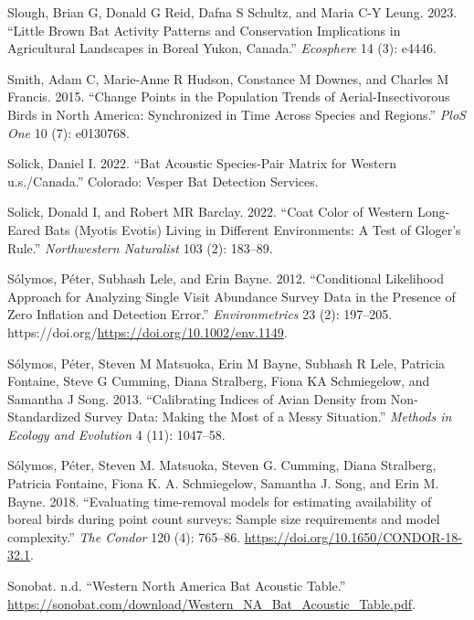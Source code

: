 \documentclass[
  letterpaper,
  DIV=11,
  numbers=noendperiod]{scrartcl}
\newlength{\cslhangindent}
\newenvironment{CSLReferences}[2] %
 {\begin{list}{}{%
  \setlength{\itemindent}{0pt}
  \setlength{\leftmargin}{0pt}
  \setlength{\parsep}{0pt}
  \ifodd #1
   \setlength{\leftmargin}{\cslhangindent}
   \setlength{\itemindent}{-1\cslhangindent}
  \fi
  \setlength{\itemsep}{#2\baselineskip}}}
 {\end{list}}
\begin{document}
\begin{CSLReferences}{1}{0}
Slough, Brian G, Donald G Reid, Dafna S Schultz, and Maria C-Y Leung.
2023. {``Little Brown Bat Activity Patterns and Conservation
Implications in Agricultural Landscapes in Boreal Yukon, Canada.''}
\emph{Ecosphere} 14 (3): e4446.

Smith, Adam C, Marie-Anne R Hudson, Constance M Downes, and Charles M
Francis. 2015. {``Change Points in the Population Trends of
Aerial-Insectivorous Birds in North America: Synchronized in Time Across
Species and Regions.''} \emph{PloS One} 10 (7): e0130768.

Solick, Daniel I. 2022. {``Bat Acoustic Species-Pair Matrix for Western
u.s./Canada.''} Colorado: Vesper Bat Detection Services.

Solick, Donald I, and Robert MR Barclay. 2022. {``Coat Color of Western
Long-Eared Bats (Myotis Evotis) Living in Different Environments: A Test
of Gloger's Rule.''} \emph{Northwestern Naturalist} 103 (2): 183--89.

Sólymos, Péter, Subhash Lele, and Erin Bayne. 2012. {``Conditional
Likelihood Approach for Analyzing Single Visit Abundance Survey Data in
the Presence of Zero Inflation and Detection Error.''}
\emph{Environmetrics} 23 (2): 197--205.
https://doi.org/\url{https://doi.org/10.1002/env.1149}.

Sólymos, Péter, Steven M Matsuoka, Erin M Bayne, Subhash R Lele,
Patricia Fontaine, Steve G Cumming, Diana Stralberg, Fiona KA
Schmiegelow, and Samantha J Song. 2013. {``Calibrating Indices of Avian
Density from Non-Standardized Survey Data: Making the Most of a Messy
Situation.''} \emph{Methods in Ecology and Evolution} 4 (11): 1047--58.

Sólymos, Péter, Steven M. Matsuoka, Steven G. Cumming, Diana Stralberg,
Patricia Fontaine, Fiona K. A. Schmiegelow, Samantha J. Song, and Erin
M. Bayne. 2018. {``{Evaluating time-removal models for estimating
availability of boreal birds during point count surveys: Sample size
requirements and model complexity}.''} \emph{The Condor} 120 (4):
765--86. \url{https://doi.org/10.1650/CONDOR-18-32.1}.

Sonobat. n.d. {``Western North America Bat Acoustic Table.''}
\url{https://sonobat.com/download/Western_NA_Bat_Acoustic_Table.pdf}.


\end{CSLReferences}
\end{document}
